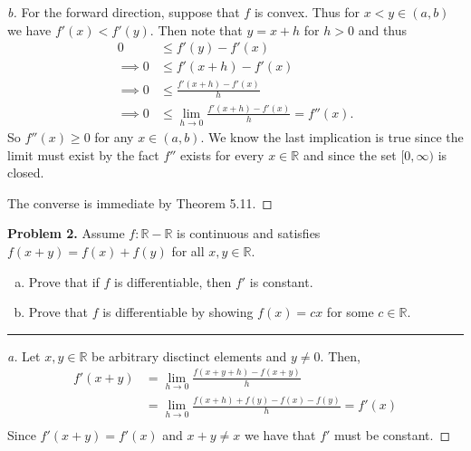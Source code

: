 \documentclass[leqno]{article}
\theoremstyle{nonumberplain}
\newtheorem{proof}{Proof}
\newcommand{\R}{\mathbb{R}}
\begin{document}
\begin{proof}[b]
For the  forward direction, suppose that $f$ is convex. Thus for $x<y\in (a,b)$ we have $f'(x)<f'(y)$. Then note that $y=x+h$ for $h>0$ and thus
\begin{align*}
0&\leq f'(y)-f'(x)\\
\implies 0&\leq f'(x+h)-f'(x)\\
\implies 0&\leq \frac{f'(x+h)-f'(x)}{h}\\
\implies 0&\leq \lim_{h\to 0}\frac{f'(x+h)-f'(x)}{h}=f''(x).
\end{align*}
So $f''(x)\geq 0$ for any $x\in (a,b)$. We know the last implication is true since the limit must exist by the fact $f''$ exists for every $x\in \R$ and since the set $[0,\infty)$ is closed.

\noindent The converse is immediate by Theorem 5.11.
\end{proof}

\pagebreak



\noindent\textbf{Problem 2.} Assume $f\colon \mathbb{R}-\mathbb{R}$ is continuous and satisfies $f(x+y)=f(x)+f(y)$ for all $x,y\in \mathbb{R}$. 
\begin{enumerate}[(a)]
\item Prove that if $f$ is differentiable, then $f'$ is constant.
\item Prove that $f$ is differentiable by showing $f(x)=cx$ for some $c\in \mathbb{R}$.
\end{enumerate}

\noindent\rule[0.5ex]{\linewidth}{1pt}

\begin{proof}[a] Let $x,y\in \R$ be arbitrary disctinct elements and $y\neq 0$.  Then,
\begin{align*}
f'(x+y)&=\lim_{h\to 0} \frac{f(x+y+h)-f(x+y)}{h}\\
&=\lim_{h\to 0} \frac{f(x+h)+f(y)-f(x)-f(y)}{h}=f'(x)\\
\end{align*}
Since $f'(x+y)=f'(x)$ and $x+y\neq x$ we have that $f'$ must be constant.
\end{proof}
\end{document}
